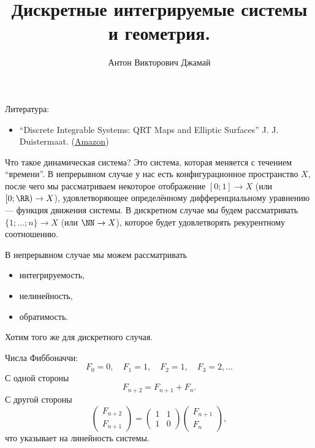 \documentclass[12pt,a4paper]{article}
\title{Дискретные интегрируемые системы и геометрия.}
\author{Антон Викторович Джамай}
\begin{document}
    \maketitle

    Литература:
    \begin{itemize}
        \item ``Discrete Integrable Systems: QRT Maps and Elliptic Surfaces'' J. J. Duistermaat. (\href{https://www.amazon.com/Discrete-Integrable-Systems-Monographs-Mathematics/dp/1441971165}{Amazon})
    \end{itemize}

    Что такое динамическая система? Это система, которая меняется с течением ``времени''. В непрерывном случае у нас есть конфигурационное пространство $X$, после чего мы рассматриваем некоторое отображение $[0; 1] \to X$ (или $[0; \RR) \to X$), удовлетворяющее определённому дифференциальному уравнению --- функция движения системы. В дискретном случае мы будем рассматривать $\{1; \dots; n\} \to X$ (или $\NN \to X$), которое будет удовлетворять рекурентному соотношению.

    В непрерывном случае мы можем рассматривать
    \begin{itemize}
        \item интегрируемость,
        \item нелинейность,
        \item обратимость.
    \end{itemize}
    Хотим того же для дискретного случая.

    \begin{example}
        Числа Фиббоначчи:
        \[F_0 = 0, \quad F_1 = 1, \quad F_2 = 1, \quad F_3 = 2, \dots\]
        С одной стороны
        \[F_{n+2} = F_{n+1} + F_n.\]
        С другой стороны
        \[
            \begin{pmatrix}
                F_{n+2}\\
                F_{n+1}
            \end{pmatrix}
            =
            \begin{pmatrix}
                1& 1\\
                1& 0
            \end{pmatrix}
            \begin{pmatrix}
                F_{n+1}\\
                F_n
            \end{pmatrix},
        \]
        что указывает на линейность системы.
    \end{example}
\end{document}
